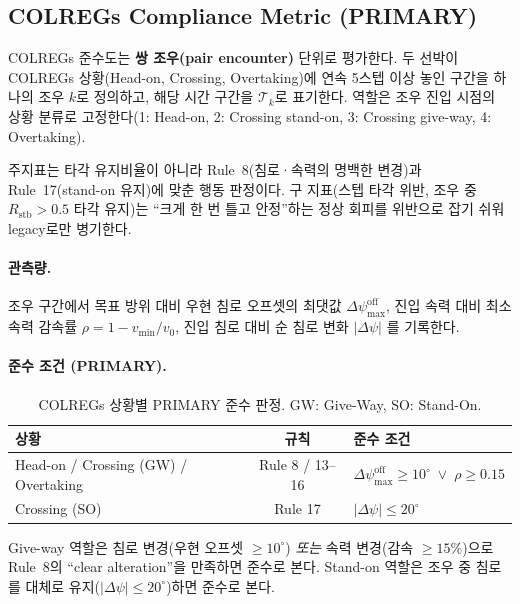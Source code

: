 \documentclass{article}
\begin{document}
\subsection*{COLREGs Compliance Metric (PRIMARY)}

COLREGs 준수도는 \textbf{쌍 조우(pair encounter)} 단위로 평가한다.
두 선박이 COLREGs 상황(Head-on, Crossing, Overtaking)에 연속 5스텝 이상 놓인 구간을 하나의 조우 $k$로 정의하고, 해당 시간 구간을 $\mathcal{T}_k$로 표기한다.
역할은 조우 진입 시점의 상황 분류로 고정한다(1: Head-on, 2: Crossing stand-on, 3: Crossing give-way, 4: Overtaking).

주지표는 타각 유지비율이 아니라 Rule~8(침로·속력의 명백한 변경)과 Rule~17(stand-on 유지)에 맞춘 행동 판정이다.
구 지표(스텝 타각 위반, 조우 중 $R_{\mathrm{stb}}{>}0.5$ 타각 유지)는 ``크게 한 번 틀고 안정''하는 정상 회피를 위반으로 잡기 쉬워 legacy로만 병기한다.

\paragraph{관측량.}
조우 구간에서 목표 방위 대비 우현 침로 오프셋의 최댓값 $\Delta\psi^{\mathrm{off}}_{\max}$,
진입 속력 대비 최소 속력 감속률
$\rho = 1 - v_{\min}/v_0$,
진입 침로 대비 순 침로 변화 $|\Delta\psi|$ 를 기록한다.

\paragraph{준수 조건 (PRIMARY).}
\begin{table}[h]
\centering
\caption{COLREGs 상황별 PRIMARY 준수 판정. GW: Give-Way, SO: Stand-On.}
\label{tab:colregs_criteria}
\renewcommand{\arraystretch}{1.3}
\begin{tabular}{@{}lcl@{}}
\toprule
\textbf{상황} & \textbf{규칙} & \textbf{준수 조건} \\
\midrule
Head-on / Crossing (GW) / Overtaking
  & Rule 8 / 13--16
  & $\Delta\psi^{\mathrm{off}}_{\max} \ge 10^\circ \;\vee\; \rho \ge 0.15$ \\
Crossing (SO)
  & Rule 17
  & $|\Delta\psi| \le 20^\circ$ \\
\bottomrule
\end{tabular}
\end{table}

\noindent Give-way 역할은 침로 변경(우현 오프셋 $\ge 10^\circ$) \emph{또는} 속력 변경(감속 $\ge 15\%$)으로 Rule~8의 ``clear alteration''을 만족하면 준수로 본다.
Stand-on 역할은 조우 중 침로를 대체로 유지($|\Delta\psi|\le 20^\circ$)하면 준수로 본다.
\end{document}
